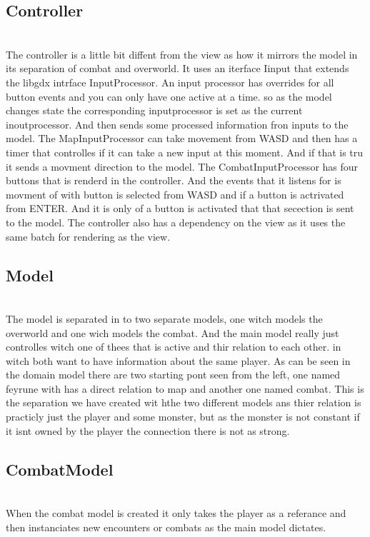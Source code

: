 \subsection{Controller}
\label{controller}

\\The controller is a little bit diffent from the view as how it mirrors the model in its separation of combat and overworld. It uses an iterface Iinput that extends the libgdx intrface InputProcessor. An input processor has overrides for all button events and you can only have one active at a time. so as the model changes state the corresponding inputprocessor is set as the current inoutprocessor. And then sends some processed information fron inputs to the model.
The MapInputProcessor can take movement from WASD and then has a timer that controlles if it can take a new input at this moment. And if that is tru it sends a movment direction to the model. The CombatInputProcessor has four buttons that is renderd in the controller. And the events that it listens for is movment of with button is selected from WASD and if a button is actrivated from ENTER. And it is only of a button is activated that that secection is sent to the model. 
The controller also has a dependency on the view as it uses the same batch for rendering as the view.
\subsection{Model}
\label{model}

\\The model is separated in to two separate models, one witch models the overworld and one wich models the combat. And the main model really just controlles witch one of thees that is active and thir relation to each other. in witch both want to have information about the same player. As can be seen in the domain model there are two starting pont seen from the left, one named feyrune with has a direct relation to map and another one named combat. This is the separation we have created wit hthe two different models ans thier relation is practicly just the player and some monster, but as the monster is not constant if it isnt owned by the player the connection there is not as strong.
\subsection{CombatModel}
\label{combatmodel}

\\When the combat model is created it only takes the player as a referance and then instanciates new encounters or combats as the main model dictates. 

